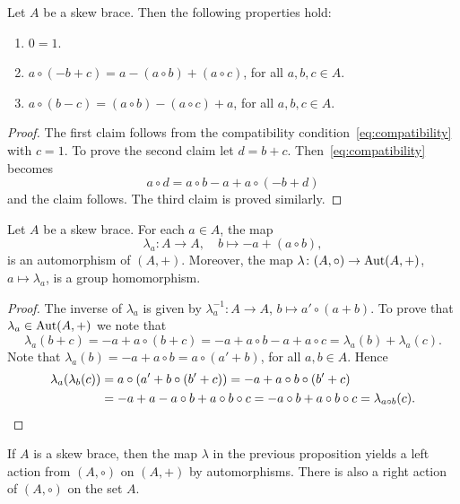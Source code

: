 \begin{lemma}
    \label{lem:basic}
	Let $A$ be a skew brace. Then the following properties hold:
    \begin{enumerate}
        \item $0=1$.  
        \item $a\circ(-b+c)=a-(a\circ b)+(a\circ c)$, for all $a,b,c\in A$.
        \item $a\circ(b-c)=(a\circ b)-(a\circ c)+a$, for all $a,b,c\in A$.
    \end{enumerate}
\end{lemma}

\begin{proof}
		The first claim follows from the compatibility condition~\eqref{eq:compatibility} with
		$c=1$.  To prove the second claim let $d=b+c$.
		Then~\eqref{eq:compatibility} becomes 
		\[
		a\circ d =a\circ b-a+a\circ (-b+d)
		\]
		and the claim follows. The third claim is
		proved similarly.
\end{proof}

\begin{proposition}
\label{pro:lambda}
    Let $A$ be a skew brace. For each $a\in A$, the map
    \[
        \lambda_a\colon A\to A,\quad
        b\mapsto -a+(a\circ b),
    \]
    is an automorphism of $(A,+)$. Moreover, the map 
    $\lambda\colon (A,\circ)\to\operatorname{Aut}(A,+)$, $a\mapsto\lambda_a$, is a group homomorphism. 
\end{proposition}

\begin{proof}
The inverse of $\lambda_a$ is given by $\lambda^{-1}_a\colon A\to A$, $b\mapsto a'\circ (a+b)$. To prove
that $\lambda_a\in\operatorname{Aut}(A,+)$ we note that
\[
\lambda_a(b+c)=-a+a\circ(b+c)=-a+a\circ b-a+a\circ c=\lambda_a(b)+\lambda_a(c).
\]
Note that $\lambda_a(b)=-a+a\circ b=a\circ (a'+b)$, for all $a,b\in A$. Hence 
\begin{align*}
\lambda_a(\lambda_b(c))&=a\circ (a'+b\circ (b'+c))=-a+a\circ b\circ (b'+c)\\
&=-a+a-a\circ b+a\circ b\circ c=-a\circ b+a\circ b\circ c=\lambda_{a\circ b}(c).\qedhere    
\end{align*}
\end{proof}

If $A$ is a skew brace, then 
the map $\lambda$ in the previous proposition yields a left action from $(A,\circ)$ on $(A,+)$ by automorphisms. 
There is also a right action of $(A,\circ)$ on the set $A$.


